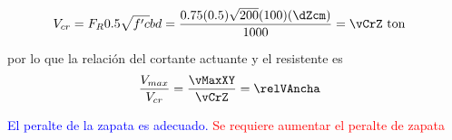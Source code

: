 \documentclass[11pt,a4paper,fleqn]{article}
\begin{document}
\begin{align*}
	&V_{cr}=F_R0.5\sqrt{f'c}bd=\frac{0.75(0.5)\sqrt{\fc}(100)(\dZcm)}{1000}=\vCrZ \text{ ton}
\end{align*}

por lo que la relación del cortante actuante y el resistente es
\begin{align*}
	&\frac{V_{max}}{V_{cr}}=\frac{\vMaxXY}{\vCrZ}=\relVAncha
\end{align*}

 \relVAncha \textcolor{blue}{El peralte de la zapata es adecuado.} \else \textcolor{red}{Se requiere aumentar el peralte de zapata} \fi

\end{document}
